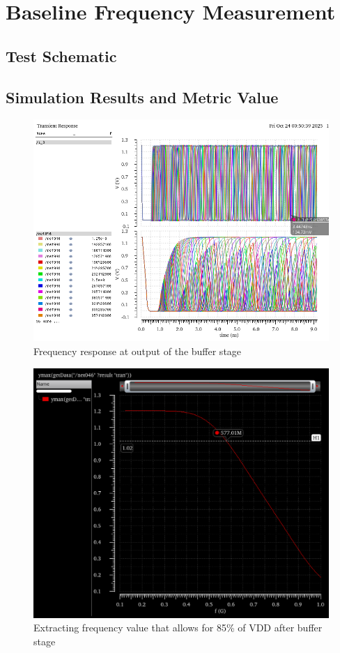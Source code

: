 \documentclass[12pt]{article}
\begin{document}
\newpage

\section{Baseline Frequency Measurement}
\subsection{Test Schematic}



\newpage

\subsection{Simulation Results and Metric Value}

\begin{figure}[H]
    \centering
    \includegraphics[width=0.75\linewidth]{writeup//figures/frequency_response_param.png}
    \caption{Frequency response at output of the buffer stage}
\end{figure}

\begin{figure}[H]
    \centering
    \includegraphics[width=0.75\linewidth]{writeup//figures/max_frequencies.png}
    \caption{Extracting frequency value that allows for 85\% of VDD after buffer stage}
\end{figure}
\end{document}
